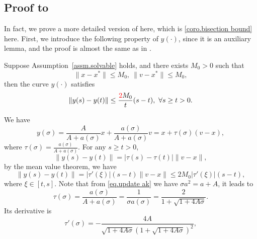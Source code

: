 \documentclass[moor,sglanonrev]{informs4}
\begin{document}
\begin{APPENDICES}
    \subsection*{Proof to }
    In fact, we prove a more detailed version of  here, which is \cref{coro.bisection bound} here. First, we introduce the following property of $y(\cdot)$, since it is an auxiliary lemma, and the proof is almost the same as in \citet{monteiro2013accelerated}.
    \begin{lemma}
        \label{lem.curve condition}
        Suppose Assumption~\ref{assm.solvable} holds, and there exists $M_0>0$ such that
        \begin{equation}\label{eq.bounded assm point}
            \|x-x^*\|\leq M_0, \ \|v-x^*\|\leq M_0,
        \end{equation}
        then the curve $y(\cdot)$ satisfies
        \begin{equation}
            \label{eq.curve condition}
            \|y(s)-y(t)\| \leq \frac{{\color{red} 2}M_0}{t}(s-t), \ \forall s\geq t >0.
        \end{equation}
    \end{lemma}
    We have
    \begin{equation*}
        y(\sigma) = \frac{A}{A+a(\sigma)}x+\frac{a(\sigma)}{A+a(\sigma)}v = x + \tau (\sigma) (v-x),
    \end{equation*}
    where $\tau(\sigma) = \frac{a(\sigma)}{A+a(\sigma)}.$ For any $s\geq t>0$,
    \begin{equation*}
        \|y(s)-y(t)\| = \left|\tau(s)-\tau(t)\right| \|v-x\|,
    \end{equation*}
    by the mean value theorem, we have
    \begin{equation*}
        \|y(s)-y(t)\| = \left|\tau'(\xi)\right|(s-t) \|v-x\|\leq 2M_0\left|\tau'(\xi)\right|(s-t),
    \end{equation*}
    where $\xi \in \left[t,s\right]$. Note that from \eqref{eq.update ak} we have $\sigma a^2=a+A$, it leads to
    \begin{equation*}
        \tau(\sigma) = \frac{a(\sigma)}{A+a(\sigma)} = \frac{1}{\sigma a(\sigma)} = \frac{2}{1+\sqrt{1+4A\sigma}}.
    \end{equation*}
    {\color{red}
    Its derivative is
    \begin{equation*}
        \tau'(\sigma) = -\frac{4A}{\sqrt{1+4A\sigma}\left(1+\sqrt{1+4A\sigma}\right)^2},

\end{equation*}}
\end{APPENDICES}
\end{document}
